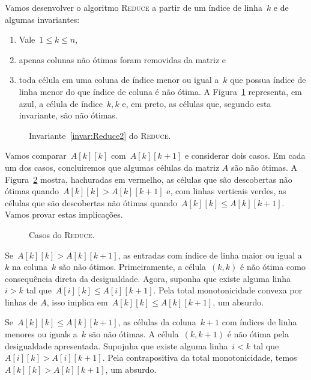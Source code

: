 Vamos desenvolver o algoritmo \textsc{Reduce} a partir de um índice de linha~$k$ e de algumas invariantes: 
\begin{enumerate}
    \item Vale~$1 \leq k \leq n$, \label{invar:Reduce0}
    \item apenas colunas não ótimas foram removidas da matriz e \label{invar:Reduce1}
    \item toda célula em uma coluna de índice menor ou igual a~$k$ que possua índice de linha menor do que índice de coluna é não ótima. A Figura~\ref{figure:Reduce1} representa, em azul, a célula de índice~$k,k$ e, em preto, as células que, segundo esta invariante, são não ótimas. \label{invar:Reduce2}
\end{enumerate}

\begin{figure}[h]
    \centering
    
    \caption{Invariante~\ref{invar:Reduce2} do \textsc{Reduce}.} \label{figure:Reduce1}
\end{figure}

Vamos comparar~$A[k][k]$ com~$A[k][k+1]$ e considerar dois casos. Em cada um dos casos, concluiremos que algumas células da matriz $A$ são não ótimas. A Figura~\ref{figure:Reduce2} mostra, hachuradas em vermelho, as células que são descobertas não ótimas quando~$A[k][k] > A[k][k+1]$ e, com linhas verticais verdes, as células que são descobertas não ótimas quando~$A[k][k] \leq A[k][k+1]$. Vamos provar estas implicações.

\begin{figure}[h]
    \centering
    
    \caption{Casos do \textsc{Reduce}.} \label{figure:Reduce2}
\end{figure}

Se~$A[k][k] > A[k][k+1]$, as entradas com índice de linha maior ou igual a~$k$ na coluna~$k$ são não ótimos. Primeiramente, a célula~$(k,k)$ é não ótima como consequência direta da desigualdade. Agora, suponha que existe alguma linha~$i>k$ tal que~$A[i][k] \leq A[i][k+1]$. Pela total monotonicidade convexa por linhas de $A$, isso implica em~$A[k][k] \leq A[k][k+1]$, um absurdo.  

Se~$A[k][k] \leq A[k][k+1]$, as células da coluna~$k+1$ com índices de linha menores ou iguals a~$k$ são não ótimas. A célula~$(k,k+1)$ é não ótima pela desigualdade apresentada. Supojnha que existe alguma linha~$i<k$ tal que~$A[i][k] > A[i][k+1]$. Pela contrapositiva da total monotonicidade, temos~$A[k][k] > A[k][k+1]$, um absurdo.  

